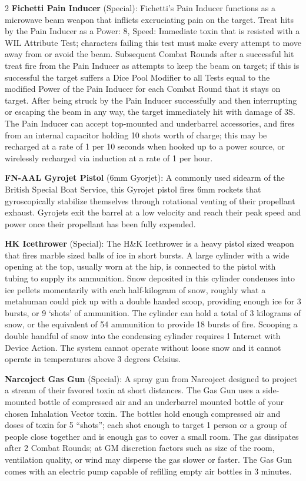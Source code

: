\documentclass[
  oneside]{article}
\begin{document}
\begin{multicols}{2}
\textbf{Fichetti Pain Inducer} (Special):
Fichetti's Pain Inducer functions as a microwave
beam weapon that inflicts excruciating pain on the
target. Treat hits by the Pain Inducer as a Power:
8, Speed: Immediate toxin that is resisted with a
WIL Attribute Test; characters failing this test
must make every attempt to move away from or avoid
the beam. Subsequent Combat Rounds after a
successful hit treat fire from the Pain Inducer as
attempts to keep the beam on target; if this is
successful the target suffers a Dice Pool Modifier
to all Tests equal to the modified Power of the
Pain Inducer for each Combat Round that it stays
on target. After being struck by the Pain Inducer
successfully and then interrupting or escaping the
beam in any way, the target immediately hit with
damage of 3S. The Pain Inducer can accept
top-mounted and underbarrel accessories, and fires
from an internal capacitor holding 10 shots worth
of charge; this may be recharged at a rate of 1
per 10 seconds when hooked up to a power source,
or wirelessly recharged via induction at a rate of
1 per hour.

\textbf{FN-AAL Gyrojet Pistol} (6mm Gyorjet): A
commonly used sidearm of the British Special Boat
Service, this Gyrojet pistol fires 6mm rockets
that gyroscopically stabilize themselves through
rotational venting of their propellant exhaust.
Gyrojets exit the barrel at a low velocity and
reach their peak speed and power once their
propellant has been fully expended.

\textbf{HK Icethrower} (Special): The H\&K
Icethrower is a heavy pistol sized weapon that
fires marble sized balls of ice in short bursts. A
large cylinder with a wide opening at the top,
usually worn at the hip, is connected to the
pistol with tubing to supply its ammunition. Snow
deposited in this cylinder condenses into ice
pellets momentarily with each half-kilogram of
snow, roughly what a metahuman could pick up with
a double handed scoop, providing enough ice for 3
bursts, or 9 `shots' of ammunition. The cylinder
can hold a total of 3 kilograms of snow, or the
equivalent of 54 ammunition to provide 18 bursts
of fire. Scooping a double handful of snow into
the condensing cylinder requires 1 Interact with
Device Action. The system cannot operate without
loose snow and it cannot operate in temperatures
above 3 degrees Celsius.

\textbf{Narcoject Gas Gun} (Special): A spray gun
from Narcoject designed to project a stream of
their favored toxin at short distances. The Gas
Gun uses a side-mounted bottle of compressed air
and an underbarrel mounted bottle of your chosen
Inhalation Vector toxin. The bottles hold enough
compressed air and doses of toxin for 5 ``shots'';
each shot enough to target 1 person or a group of
people close together and is enough gas to cover a
small room. The gas dissipates after 2 Combat
Rounds; at GM discretion factors such as size of
the room, ventilation quality, or wind may
disperse the gas slower or faster. The Gas Gun
comes with an electric pump capable of refilling
empty air bottles in 3 minutes.


\end{multicols}
\end{document}
